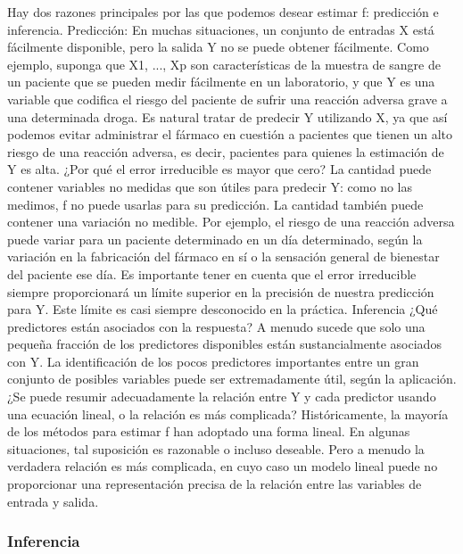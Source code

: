 \documentclass[
  letterpaper,
  DIV=11,
  numbers=noendperiod]{scrartcl}
\begin{document}
Hay dos razones principales por las que podemos desear estimar f:
predicción e inferencia. Predicción: En muchas situaciones, un conjunto
de entradas X está fácilmente disponible, pero la salida Y no se puede
obtener fácilmente. Como ejemplo, suponga que X1, ..., Xp son
características de la muestra de sangre de un paciente que se pueden
medir fácilmente en un laboratorio, y que Y es una variable que codifica
el riesgo del paciente de sufrir una reacción adversa grave a una
determinada droga. Es natural tratar de predecir Y utilizando X, ya que
así podemos evitar administrar el fármaco en cuestión a pacientes que
tienen un alto riesgo de una reacción adversa, es decir, pacientes para
quienes la estimación de Y es alta. ¿Por qué el error irreducible es
mayor que cero? La cantidad puede contener variables no medidas que son
útiles para predecir Y: como no las medimos, f no puede usarlas para su
predicción. La cantidad también puede contener una variación no medible.
Por ejemplo, el riesgo de una reacción adversa puede variar para un
paciente determinado en un día determinado, según la variación en la
fabricación del fármaco en sí o la sensación general de bienestar del
paciente ese día. Es importante tener en cuenta que el error irreducible
siempre proporcionará un límite superior en la precisión de nuestra
predicción para Y. Este límite es casi siempre desconocido en la
práctica. Inferencia ¿Qué predictores están asociados con la respuesta?
A menudo sucede que solo una pequeña fracción de los predictores
disponibles están sustancialmente asociados con Y. La identificación de
los pocos predictores importantes entre un gran conjunto de posibles
variables puede ser extremadamente útil, según la aplicación. ¿Se puede
resumir adecuadamente la relación entre Y y cada predictor usando una
ecuación lineal, o la relación es más complicada? Históricamente, la
mayoría de los métodos para estimar f han adoptado una forma lineal. En
algunas situaciones, tal suposición es razonable o incluso deseable.
Pero a menudo la verdadera relación es más complicada, en cuyo caso un
modelo lineal puede no proporcionar una representación precisa de la
relación entre las variables de entrada y salida.

\hypertarget{inferencia}{%
\subsubsection{\texorpdfstring{\textbf{Inferencia}}{Inferencia}}\label{inferencia}}
\end{document}
